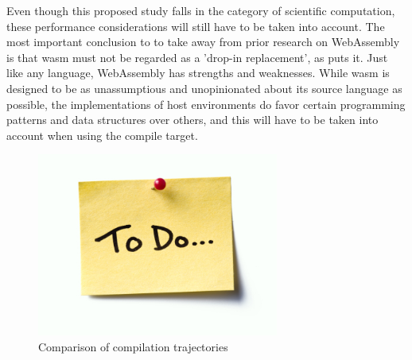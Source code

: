 Even though this proposed study falls in the category of scientific computation, these performance considerations will still have to be taken into account. The most important conclusion to to take away from prior research on WebAssembly is that \ac{wasm} must not be regarded as a 'drop-in replacement', as \cite{melch_performance_2019} puts it. Just like any language, WebAssembly has strengths and weaknesses. While \ac{wasm} is designed to be as unassumptious and unopinionated about its source language as possible, the implementations of host environments do favor certain programming patterns and data structures over others, and this will have to be taken into account when using the compile target.

\begin{figure}[!tbp]
  \centering
  \begin{minipage}[b]{0.80\textwidth}
    \graphicspath{ {../../assets/images/misc/} }
    \includegraphics[width=300px]{todo.jpg}
    \caption{Comparison of compilation trajectories}
    \label{fig:wasm-trajectory}
  \end{minipage}
\end{figure}



